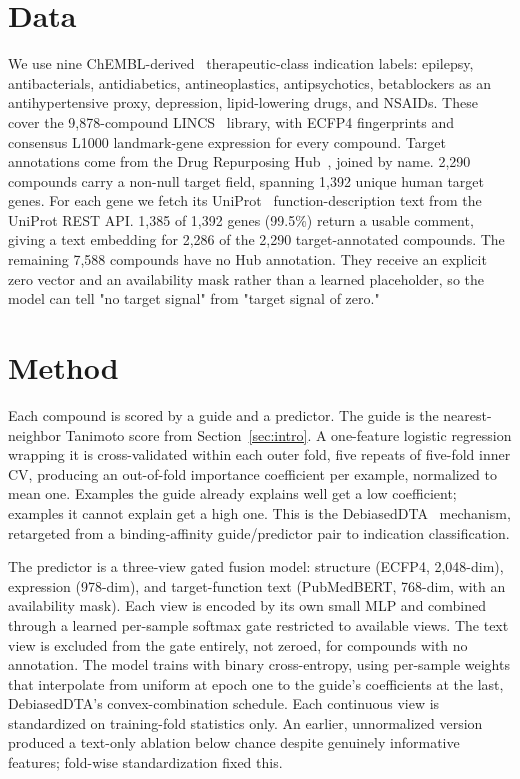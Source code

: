 \documentclass{llncs}
\begin{document}
\section{Data}
We use nine ChEMBL-derived~\cite{gaulton2017chembl,zdrazil2024chembl} therapeutic-class indication labels: epilepsy, antibacterials, antidiabetics, antineoplastics, antipsychotics, betablockers as an antihypertensive proxy, depression, lipid-lowering drugs, and NSAIDs. These cover the 9{,}878-compound LINCS~\cite{subramanian2017l1000} library, with ECFP4 fingerprints and consensus L1000 landmark-gene expression for every compound. Target annotations come from the Drug Repurposing Hub~\cite{corsello2017repurposinghub}, joined by name. 2{,}290 compounds carry a non-null target field, spanning 1{,}392 unique human target genes. For each gene we fetch its UniProt~\cite{uniprot2023} function-description text from the UniProt REST API. 1{,}385 of 1{,}392 genes (99.5\%) return a usable comment, giving a text embedding for 2{,}286 of the 2{,}290 target-annotated compounds. The remaining 7{,}588 compounds have no Hub annotation. They receive an explicit zero vector and an availability mask rather than a learned placeholder, so the model can tell "no target signal" from "target signal of zero."

\section{Method}
Each compound is scored by a guide and a predictor. The guide is the nearest-neighbor Tanimoto score from Section~\ref{sec:intro}. A one-feature logistic regression wrapping it is cross-validated within each outer fold, five repeats of five-fold inner CV, producing an out-of-fold importance coefficient per example, normalized to mean one. Examples the guide already explains well get a low coefficient; examples it cannot explain get a high one. This is the DebiasedDTA~\cite{ozcelik2023debiaseddta} mechanism, retargeted from a binding-affinity guide/predictor pair to indication classification.

The predictor is a three-view gated fusion model: structure (ECFP4, 2{,}048-dim), expression (978-dim), and target-function text (PubMedBERT, 768-dim, with an availability mask). Each view is encoded by its own small MLP and combined through a learned per-sample softmax gate restricted to available views. The text view is excluded from the gate entirely, not zeroed, for compounds with no annotation. The model trains with binary cross-entropy, using per-sample weights that interpolate from uniform at epoch one to the guide's coefficients at the last, DebiasedDTA's convex-combination schedule. Each continuous view is standardized on training-fold statistics only. An earlier, unnormalized version produced a text-only ablation below chance despite genuinely informative features; fold-wise standardization fixed this.
\end{document}
